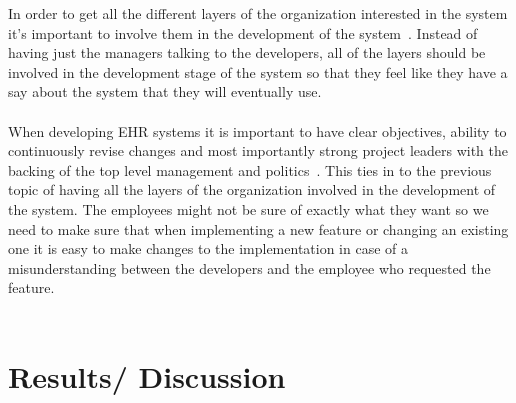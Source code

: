 \documentclass[14pt]{article}
\begin{document}
 In order to get all the different layers of the organization interested in the system it's important to involve them in the development of the system~\cite{Empirica}. Instead of having just the managers talking to the developers, all of the layers should be involved in the development stage of the system so that they feel like they have a say about the system that they will eventually use.
\\\\
When developing \gls{EHR} systems it is important to have clear objectives, ability to continuously revise changes and most importantly strong project leaders with the backing of the top level management and politics~\cite{Empirica}. This ties in to the previous topic of having all the layers of the organization involved in the development of the system. The employees might not be sure of exactly what they want so we need to make sure that when implementing a new feature or changing an existing one it is easy to make changes to the implementation in case of a misunderstanding between the developers and the employee who requested the feature.
\\\\


\newpage

\section{Results/ Discussion}
\label{sec:Results}
\end{document}
